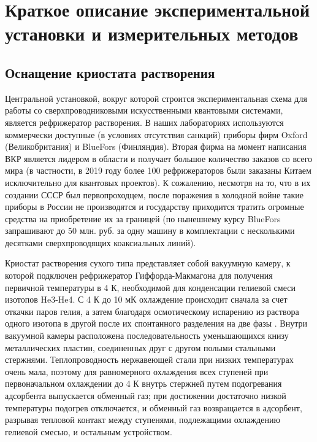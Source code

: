 \documentclass[14pt, a4paper]{extreport}
\numberwithin{equation}{section}
\begin{document}
\section{Краткое описание экспериментальной установки и измерительных методов}

\subsection{Оснащение криостата растворения}

Центральной установкой, вокруг которой строится экспериментальная схема для работы со сверхпроводниковыми искусственными квантовыми системами, является рефрижератор растворения. В наших лабораториях используются коммерчески доступные (в условиях отсутствия санкций) приборы фирм Oxford (Великобритания) и BlueFors (Финляндия). Вторая фирма на момент написания ВКР является лидером в области и получает большое количество заказов со всего мира (в частности, в 2019 году более 100 рефрижераторов были заказаны Китаем исключительно для квантовых проектов). К сожалению, несмотря на то, что в их создании СССР был первопроходцем, после поражения в холодной войне такие приборы в России не производятся и государству приходится тратить огромные средства на приобретение их за границей (по нынешнему курсу BlueFors запрашивают до 50 млн. руб. за одну машину в комплектации с несколькими десятками сверхпроводящих коаксиальных линий). 

Криостат растворения сухого типа представляет собой вакуумную камеру, к которой подключен рефрижератор Гиффорда-Макмагона для получения первичной температуры в 4 К, необходимой для конденсации гелиевой смеси изотопов He3-He4. С 4 К до 10 мК охлаждение происходит сначала за счет откачки паров гелия, а затем благодаря осмотическому испарению из раствора одного изотопа в другой после их спонтанного разделения на две фазы \cite{wheatley1968principles, batey2015principles}. Внутри вакуумной камеры расположена последовательность уменьшающихся книзу металлических пластин, соединенных друг с другом полыми стальными стержнями. Теплопроводность нержавеющей стали при низких температурах очень мала, поэтому для равномерного охлаждения всех ступеней при первоначальном охлаждении до 4 К внутрь стержней путем подогревания адсорбента выпускается обменный газ; при достижении достаточно низкой температуры подогрев отключается, и обменный газ возвращается в адсорбент, разрывая тепловой контакт между ступенями, подлежащими охлаждению гелиевой смесью, и остальным устройством.
\end{document}

